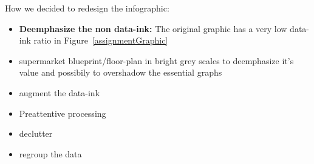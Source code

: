 How we decided to redesign the infographic:

\begin{itemize}
	\item \textbf{Deemphasize the non data-ink:} The original graphic has a very low data-ink ratio in Figure~\ref{assignmentGraphic} 
    \item supermarket blueprint/floor-plan in bright grey scales to deemphasize
		it's value and possibily to overshadow the essential graphs
	\item augment the data-ink
    \item Preattentive processing
	\item declutter
	\item regroup the data
\end{itemize}